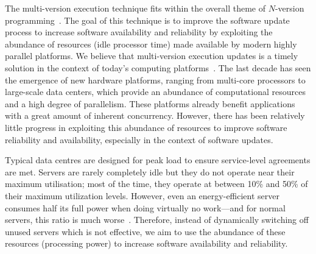
The multi-version execution technique fits within the overall theme of
$N$-version programming~\cite{avizienis:nvp,chen1995}. The goal of this
technique is to improve the software update process to increase software
availability and reliability by exploiting the abundance of resources (\eg idle
processor time) made available by modern highly parallel platforms.  We believe
that multi-version execution updates is a timely solution in the context of
today's computing platforms~\cite{multiplicity}. The last decade has seen the
emergence of new hardware platforms, ranging from multi-core processors to
large-scale data centers, which provide an abundance of computational resources
and a high degree of parallelism. These platforms already benefit applications
with a great amount of inherent concurrency.  However, there has been
relatively little progress in exploiting this abundance of resources to improve
software reliability and availability, especially in the context of software
updates.

Typical data centres are designed for peak load to ensure service-level
agreements are met. Servers are rarely completely idle but they do not operate
near their maximum utilisation; most of the time, they operate at between 10\%
and 50\% of their maximum utilization levels. However, even an energy-efficient
server consumes half its full power when doing virtually no work---and for
normal servers, this ratio is much worse~\cite{barroso2007}.  Therefore,
instead of dynamically switching off unused servers which is not effective, we
aim to use the abundance of these resources (\ie processing power) to increase
software availability and reliability.

